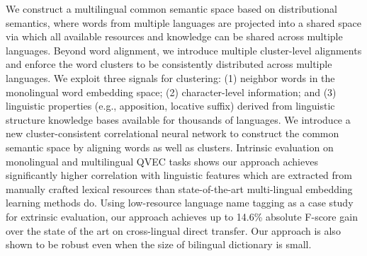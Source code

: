We construct a multilingual common semantic space based on distributional semantics, where words from multiple languages are projected into a shared space via which all available resources and knowledge can be shared across multiple languages. Beyond word alignment, we introduce multiple cluster-level alignments and enforce the word clusters to be consistently distributed across multiple languages. We exploit three signals for clustering: (1) neighbor words in the monolingual word embedding space; (2) character-level information; and (3) linguistic properties (e.g., apposition, locative suffix) derived from linguistic structure knowledge bases available for thousands of languages. We introduce a new cluster-consistent correlational neural network to construct the common semantic space by aligning words as well as clusters. Intrinsic evaluation on monolingual and multilingual QVEC tasks shows our approach achieves significantly higher correlation with linguistic features which are extracted from manually crafted lexical resources than state-of-the-art multi-lingual embedding learning methods do. Using low-resource language name tagging as a case study for extrinsic evaluation, our approach achieves up to 14.6\% absolute F-score gain over the state of the art on cross-lingual direct transfer. Our approach is also shown to be robust even when the size of bilingual dictionary is small.
